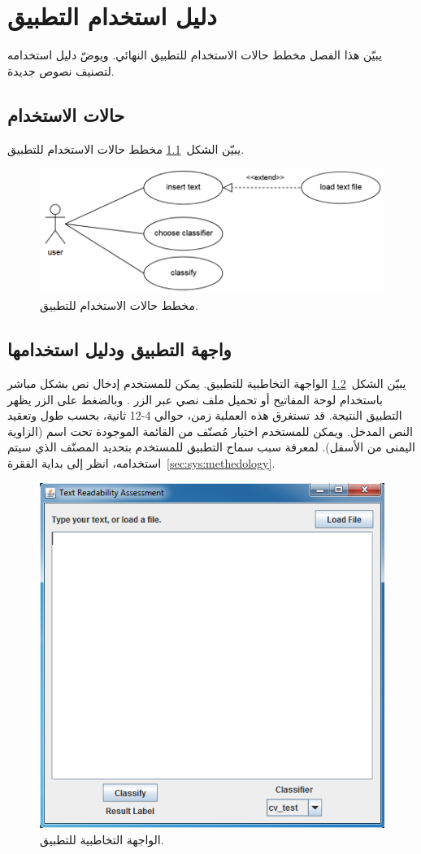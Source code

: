 

\chapter{دليل استخدام التطبيق}
يبيّن هذا الفصل مخطط حالات الاستخدام للتطبيق النهائي.
ويوضّ دليل استخدامه لتصنيف نصوص جديدة.

\section{حالات الاستخدام}
يبيّن الشكل~\ref{fig:man:use-case} مخطط حالات الاستخدام للتطبيق.

\begin{figure}[htb]
	\centering
	\includegraphics[width=0.8\linewidth]{images/use-case-diagram.png}
	\caption{%
		مخطط حالات الاستخدام للتطبيق.
	}
	\label{fig:man:use-case}
\end{figure}


\section{واجهة التطبيق ودليل استخدامها}

يبيّن الشكل~\ref{fig:man:gui} الواجهة التخاطبية للتطبيق.
يمكن للمستخدم إدخال نص بشكل مباشر باستخدام لوحة المفاتيح أو تحميل ملف نصي عبر الزر .
وبالضغط على الزر  يظهر التطبيق النتيجة.
قد تستغرق هذه العملية زمن، حوالي 4-12 ثانية، بحسب طول وتعقيد النص المدخل.
ويمكن للمستخدم اختيار مُصنّف من القائمة الموجودة تحت اسم  (الزاوية اليمنى من الأسفل).
لمعرفة سبب سماح التطبيق للمستخدم بتحديد المصنّف الذي سيتم استخدامه،
انظر إلى بداية الفقرة~\ref{sec:sys:methedology}.


\begin{figure}[htb]
	\centering
	\includegraphics[width=0.7\linewidth]{images/app-gui.png}
	\caption{%
		الواجهة التخاطبية للتطبيق.
	}
	\label{fig:man:gui}
\end{figure}

